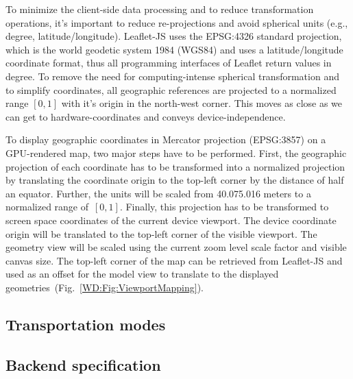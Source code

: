       To minimize the client-side data processing and to reduce transformation operations,
      it's important to reduce re-projections and avoid spherical units (e.g., degree,
      latitude/longitude). Leaflet-JS uses the EPSG:4326 standard projection, which is
      the world geodetic system 1984 (WGS84) and uses a latitude/longitude coordinate
      format, thus all programming interfaces of Leaflet return values in degree.
      To remove the need for computing-intense spherical transformation and to simplify
      coordinates, all geographic references are projected to a normalized range $[0, 1]$
      with it's origin in the north-west corner. This moves as close as we can get to
      hardware-coordinates and conveys device-independence.\par
      To dis\-play geographic coordinates in Mercator projection (EPSG:3857) on a GPU-rendered
      map, two major steps have to be performed. First, the geographic projection of
      each coordinate has to be transformed into a normalized projection by translating
      the coordinate origin to the top-left corner by the distance of half an equator.
      Further, the units will be scaled from 40.075.016 meters to a normalized range
      of~$[0,1]$. Finally, this projection has to be transformed to screen space coordinates
      of the current device viewport.  The device coordinate origin will be translated
      to the top-left corner of the visible viewport. The geometry view will be scaled
      using the current zoom level scale factor and visible canvas size. The top-left
      corner of the map can be retrieved from Leaflet-JS and used as an offset for
      the model view to translate to the displayed geometries~(Fig.~\ref{WD:Fig:ViewportMapping}).
    \subsection{Transportation modes}
    \subsection{Backend specification}
    \label{sec:conc:back}
